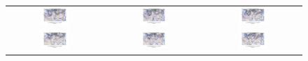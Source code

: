\begin{figure}
	\centering
	\renewcommand{\arraystretch}{0.5}
	\begin{tabular}{ccc}
		\includegraphics[width=0.32\textwidth, trim=3cm 3cm 3cm 1.1cm, clip]{papers/rossby/images/data_2010_7_27_12_00_500.jpg} &
		\includegraphics[width=0.32\textwidth, trim=3cm 3cm 3cm 1.1cm, clip]{papers/rossby/images/data_2010_7_28_12_00_500.jpg} &
		\includegraphics[width=0.32\textwidth, trim=3cm 3cm 3cm 1.1cm, clip]{papers/rossby/images/data_2010_7_29_12_00_500.jpg}   \\
		\includegraphics[width=0.32\textwidth, trim=3cm 3cm 3cm 1.1cm, clip]{papers/rossby/images/data_2010_7_30_12_00_500.jpg} &
		\includegraphics[width=0.32\textwidth, trim=3cm 3cm 3cm 1.1cm, clip]{papers/rossby/images/data_2010_7_31_12_00_500.jpg} &
		\includegraphics[width=0.32\textwidth, trim=3cm 3cm 3cm 1.1cm, clip]{papers/rossby/images/data_2010_8_1_12_00_500.jpg}    \\

\end{tabular}
\end{figure}
